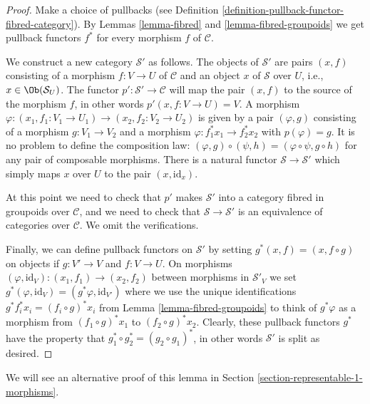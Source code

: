 \begin{proof}
Make a choice of pullbacks (see
Definition \ref{definition-pullback-functor-fibred-category}).
By Lemmas \ref{lemma-fibred} and \ref{lemma-fibred-groupoids}
we get pullback functors $f^*$ for
every morphism $f$ of $\mathcal{C}$.

\medskip\noindent
We construct a new category $\mathcal{S}'$ as follows.
The objects of $\mathcal{S}'$ are pairs $(x, f)$
consisting of a morphism $f : V \to U$ of $\mathcal{C}$
and an object $x$ of $\mathcal{S}$ over $U$, i.e.,
$x\in \Ob(\mathcal{S}_U)$. The functor
$p' : \mathcal{S}' \to \mathcal{C}$ will map the pair $(x, f)$ to the source
of the morphism $f$, in other words $p'(x, f : V\to U) = V$. A morphism
$\varphi : (x_1, f_1: V_1 \to U_1) \to (x_2, f_2 : V_2 \to U_2)$ is given by a
pair $(\varphi, g)$ consisting of a morphism $g : V_1 \to V_2$ and a morphism
$\varphi : f_1^\ast x_1 \to f_2^\ast x_2$ with $p(\varphi) = g$. It is no
problem to define the composition law: $(\varphi, g) \circ (\psi, h) =
(\varphi \circ \psi, g\circ h)$ for any pair of composable morphisms.
There is a natural functor $\mathcal{S} \to \mathcal{S}'$ which simply maps
$x$ over $U$ to the pair $(x, \text{id}_x)$.

\medskip\noindent
At this point we need to check that $p'$ makes $\mathcal{S}'$ into a category
fibred in groupoids over $\mathcal{C}$, and we need to check that
$\mathcal{S} \to \mathcal{S}'$ is an equivalence of categories over
$\mathcal{C}$. We omit the verifications.

\medskip\noindent
Finally, we can define pullback functors on $\mathcal{S}'$
by setting $g^\ast(x, f) = (x, f \circ g)$ on objects if
$g : V' \to V$ and $f : V \to U$. On morphisms
$(\varphi, \text{id}_V) : (x_1, f_1) \to (x_2, f_2)$
between morphisms in $\mathcal{S}'_V$ we set $g^\ast(\varphi, \text{id}_V) =
(g^\ast\varphi, \text{id}_{V'})$ where we use the unique identifications
$g^\ast f_i^\ast x_i = (f_i \circ g)^\ast x_i$ from Lemma
\ref{lemma-fibred-groupoids} to think of $g^\ast\varphi$ as a morphism from
$(f_1 \circ g)^\ast x_1$ to $(f_2 \circ g)^\ast x_2$. Clearly, these pullback
functors $g^\ast$ have the property that
$g_1^\ast \circ g_2^\ast = (g_2\circ g_1)^\ast$, in other words $\mathcal{S}'$
is split as desired.
\end{proof}

\noindent
We will see an alternative proof of this lemma in
Section \ref{section-representable-1-morphisms}.








